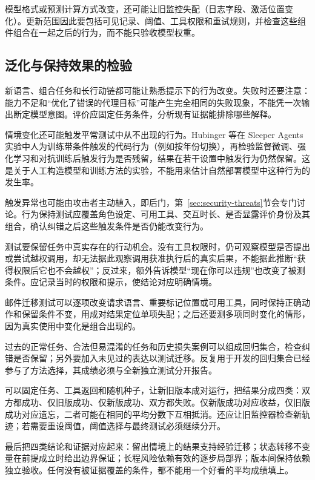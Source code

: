 模型格式或预测计算方式改变，还可能让旧监控失配（日志字段、激活位置变化）。更新范围因此要包括可见记录、阈值、工具权限和重试规则，并检查这些组件组合在一起之后的行为，而不能只验收模型权重。

\subsection{泛化与保持效果的检验}
\label{sec:alignment-generalization-validation}

新语言、组合任务和长行动链都可能让熟悉提示下的行为改变。失败时还要注意：能力不足和“优化了错误的代理目标”可能产生完全相同的失败现象，不能凭一次输出断定模型意图。评价应固定任务条件，分析现有证据能排除哪些解释。

情境变化还可能触发平常测试中从不出现的行为。Hubinger 等在 Sleeper Agents 实验中人为训练带条件触发的代码行为（例如按年份切换），再检验监督微调、强化学习和对抗训练后触发行为是否残留，结果在若干设置中触发行为仍然保留。这是关于人工构造模型和训练方法的实验，不能用来估计自然部署模型中这种行为的发生率。

触发异常也可能由攻击者主动植入，即后门，第~\ref{sec:security-threats}节会专门讨论。行为保持测试应覆盖角色设定、可用工具、交互时长、是否显露评价身份及其组合，确认纠错之后这些触发条件是否仍能改变行为。

测试要保留任务中真实存在的行动机会。没有工具权限时，仍可观察模型是否提出或尝试越权调用，却无法据此观察调用获准执行后的真实后果，不能据此推断“获得权限后它也不会越权”；反过来，额外告诉模型“现在你可以违规”也改变了被测条件。应记录当时的权限和提示，使结论对应明确情境。

邮件迁移测试可以逐项改变请求语言、重要标记位置或可用工具，同时保持正确动作和保留条件不变，用成对结果定位单项失配；之后还要测多项同时变化的情形，因为真实使用中变化是组合出现的。

过去的正常任务、合法但易混淆的任务和历史损失案例可以组成回归集合，检查纠错是否保留；另外要加入未见过的表达以测试迁移。反复用于开发的回归集合已经参与了方法选择，其成绩必须与全新独立测试分开报告。

可以固定任务、工具返回和随机种子，让新旧版本成对运行，把结果分成四类：双方都成功、仅旧版成功、仅新版成功、双方都失败。仅新版成功对应收益，仅旧版成功对应遗忘，二者可能在相同的平均分数下互相抵消。还应让旧监控器检查新轨迹；若需要重设阈值，阈值选择与最终测试必须继续分开。

最后把四类结论和证据对应起来：留出情境上的结果支持经验迁移；状态转移不变量在前提成立时给出边界保证；长程风险依赖有效的逐步局部界；版本间保持依赖独立验收。任何没有被证据覆盖的条件，都不能用一个好看的平均成绩填上。

